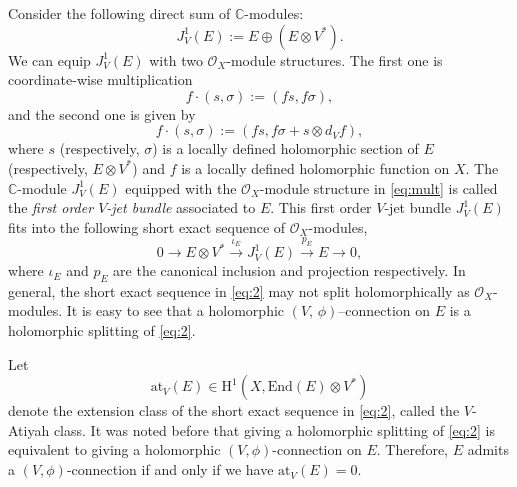 \documentclass[12pt,reqno]{amsart}
\numberwithin{equation}{section}
\theoremstyle{definition}
\begin{document}
Consider the following direct sum of $\mathbb{C}$-modules:
\begin{equation}\label{eq:jet}
J^1_{V}(E) :=  E\oplus(E\otimes V^*).
 \end{equation}
We can equip $J^1_{V}(E)$ with two $\mathcal{O}_X$-module structures. The first one is coordinate-wise
multiplication $$ f \cdot (s,  \sigma)  :=  (f s,   f \sigma),$$
and the second one is given by
\begin{equation}
\label{eq:mult}
f \cdot (s,  \sigma) := (f s,  f \sigma + s \otimes d_{V}f),
\end{equation}
where $s$ (respectively, $\sigma$) is a locally defined holomorphic section of $E$
(respectively, $E\otimes V^*$) and $f$ is a locally defined holomorphic function on $X$. The $\mathbb{C}$-module
$J^1_{V}(E)$ equipped with the $\mathcal{O}_X$-module structure in \eqref{eq:mult} is called the {\it first order $V$-jet bundle}
associated to $E$. This first order $V$-jet bundle $J^1_{V}(E)$ fits into
the following short exact sequence of $\mathcal{O}_X$-modules,
\begin{equation}\label{eq:2}
0 \longrightarrow  E\otimes V^* \xrightarrow{\, \iota_E\,} J^1_{V}(E)  \xrightarrow{\,p_E \,} E \longrightarrow 0,
\end{equation}
where $\iota_E$ and $p_E$ are the canonical inclusion and projection respectively. 
In general, the short exact sequence in \eqref{eq:2} may not split holomorphically as $\mathcal{O}_X$-modules.
It is easy to see that a holomorphic $(V,\, \phi)$--connection on $E$ is a holomorphic splitting of \eqref{eq:2}.

Let 
\begin{equation}\label{eq:at}
\mathrm{at}_V(E) \in  \mathrm{H}^1(X, \mathrm{End}(E) \otimes V^* )
\end{equation}
denote the extension class of the short exact sequence in \eqref{eq:2}, called the $V$-Atiyah class.
It was noted before that giving a holomorphic splitting of \eqref{eq:2} is equivalent to giving a
holomorphic $(V, \phi)$-connection on $E$. Therefore, 
$E$ admits a $(V, \phi)$-connection if and only if we have $\mathrm{at}_V(E)  =  0$.
\end{document}
